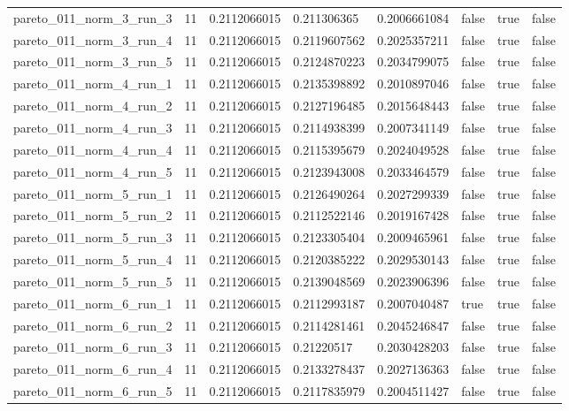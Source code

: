 \begin{tabular}{@{}llllllll@{}}
pareto\_011\_norm\_3\_run\_3 & 11 & 0.2112066015 & 0.211306365 & 0.2006661084 & false & true & false \\
pareto\_011\_norm\_3\_run\_4 & 11 & 0.2112066015 & 0.2119607562 & 0.2025357211 & false & true & false \\
pareto\_011\_norm\_3\_run\_5 & 11 & 0.2112066015 & 0.2124870223 & 0.2034799075 & false & true & false \\
pareto\_011\_norm\_4\_run\_1 & 11 & 0.2112066015 & 0.2135398892 & 0.2010897046 & false & true & false \\
pareto\_011\_norm\_4\_run\_2 & 11 & 0.2112066015 & 0.2127196485 & 0.2015648443 & false & true & false \\
pareto\_011\_norm\_4\_run\_3 & 11 & 0.2112066015 & 0.2114938399 & 0.2007341149 & false & true & false \\
pareto\_011\_norm\_4\_run\_4 & 11 & 0.2112066015 & 0.2115395679 & 0.2024049528 & false & true & false \\
pareto\_011\_norm\_4\_run\_5 & 11 & 0.2112066015 & 0.2123943008 & 0.2033464579 & false & true & false \\
pareto\_011\_norm\_5\_run\_1 & 11 & 0.2112066015 & 0.2126490264 & 0.2027299339 & false & true & false \\
pareto\_011\_norm\_5\_run\_2 & 11 & 0.2112066015 & 0.2112522146 & 0.2019167428 & false & true & false \\
pareto\_011\_norm\_5\_run\_3 & 11 & 0.2112066015 & 0.2123305404 & 0.2009465961 & false & true & false \\
pareto\_011\_norm\_5\_run\_4 & 11 & 0.2112066015 & 0.2120385222 & 0.2029530143 & false & true & false \\
pareto\_011\_norm\_5\_run\_5 & 11 & 0.2112066015 & 0.2139048569 & 0.2023906396 & false & true & false \\
pareto\_011\_norm\_6\_run\_1 & 11 & 0.2112066015 & 0.2112993187 & 0.2007040487 & true & true & false \\
pareto\_011\_norm\_6\_run\_2 & 11 & 0.2112066015 & 0.2114281461 & 0.2045246847 & false & true & false \\
pareto\_011\_norm\_6\_run\_3 & 11 & 0.2112066015 & 0.21220517 & 0.2030428203 & false & true & false \\
pareto\_011\_norm\_6\_run\_4 & 11 & 0.2112066015 & 0.2133278437 & 0.2027136363 & false & true & false \\
pareto\_011\_norm\_6\_run\_5 & 11 & 0.2112066015 & 0.2117835979 & 0.2004511427 & false & true & false \\

\end{tabular}

